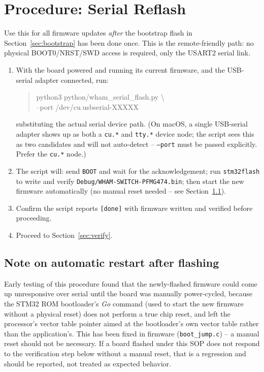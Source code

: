 \documentclass[11pt]{article}
\newcommand{\code}[1]{\texttt{#1}}
\begin{document}
\section{Procedure: Serial Reflash}
\label{sec:serial-flash}

Use this for all firmware updates \emph{after} the bootstrap flash in
Section~\ref{sec:bootstrap} has been done once. This is the
remote-friendly path: no physical BOOT0\slash NRST\slash SWD access is
required, only the USART2 serial link.

\begin{enumerate}[label=\arabic*.]
  \item With the board powered and running its current firmware, and the
    USB-serial adapter connected, run:
\begin{quote}\ttfamily\small\raggedright
python3 python/wham\_serial\_flash.py \textbackslash\\
\hspace*{1em}--port /dev/cu.usbserial-XXXXX
\end{quote}
    substituting the actual serial device path. (On macOS, a single
    USB-serial adapter shows up as both a \code{cu.*} and \code{tty.*}
    device node; the script sees this as two candidates and will not
    auto-detect -- \code{--port} must be passed explicitly. Prefer the
    \code{cu.*} node.)
  \item The script will: send \code{BOOT} and wait for the
    acknowledgement; run \code{stm32flash} to write and verify
    \code{Debug/WHAM-SWITCH-PFMG474.bin}; then start the new firmware
    automatically (no manual reset needed -- see
    Section~\ref{sec:reset-note}).
  \item Confirm the script reports \texttt{[done]} with firmware
    written and verified before proceeding.
  \item Proceed to Section~\ref{sec:verify}.
\end{enumerate}

\subsection{Note on automatic restart after flashing}
\label{sec:reset-note}

Early testing of this procedure found that the newly-flashed firmware
could come up unresponsive over serial until the board was manually
power-cycled, because the STM32 ROM bootloader's \emph{Go} command (used
to start the new firmware without a physical reset) does not perform a
true chip reset, and left the processor's vector table pointer aimed at
the bootloader's own vector table rather than the application's. This
has been fixed in firmware (\code{boot\_jump.c}) -- a manual reset should
not be necessary. If a board flashed under this SOP does not respond to
the verification step below without a manual reset, that is a
regression and should be reported, not treated as expected behavior.
\end{document}
